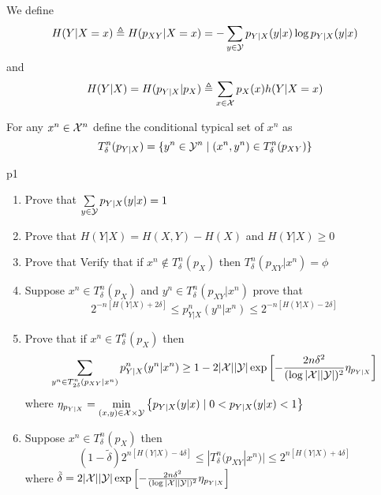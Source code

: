 \documentclass[a4paper, 11pt]{article}
\begin{document}
 We define $$H(Y|X=x)\triangleq H(p_{XY}|X=x)=-\sum_{y\in \mathcal{Y}}p_{Y|X}(y|x)\log p_{Y|X}(y|x)$$ and $$H(Y|X)=H(p_{Y|X}|p_X)\triangleq \sum_{x\in \mathcal{X}}p_X(x)h(Y|X=x)$$
 
 For any $x^n\in \mathcal{X}^n$ define the conditional typical set of $x^n$ as $$T_{\delta}^n(p_{Y|X})=\left\{ y^n\in \mathcal{Y}^n\mid (x^n,y^n)\in T_{\delta}^n(p_{XY}) \right\}$$
\begin{problem}{%
	}{p1%
	}
	\begin{enumerate}
		\item Prove that $\sum\limits_{y\in \mathcal{Y}}p_{Y|X}(y|x)=1$
		\item Prove that  $H(Y|X)=H(X,Y)-H(X)$ and $H(Y|X)\geq 0$
		\item Prove that Verify that if $x^n\notin T_{\delta}^n(p_X)$ then $T_{\delta}^n(p_{XY}|x^n)=\phi$
		\item Suppose $x^n\in T_{\delta}^n(p_X)$ and $y^n\in T_{\delta}^n(p_{XY}|x^n)$ prove that $$2^{-n[H(Y|X)+2\delta]}\leq p^n_{Y|X}(y^n|x^n)\leq 2^{-n[H(Y|X)-2\delta]}$$
		\item Prove that if $x^n\in T_{\delta}^n(p_{X})$ then $$\sum_{y^n\in T_{2\delta}^n(p_{XY}|x^n)}p_{Y|X}^n(y^n|x^n)\geq 1-2|\mathcal{X}||\mathcal{Y}|\exp\left[ -\frac{2n\delta^2}{(\log |\mathcal{X}||\mathcal{Y}|)^2} \eta_{p_{Y|X}}\right]$$ where $\eta_{p_{Y|X}}=\min\limits_{(x,y)\in \mathcal{X}\times \mathcal{Y}}\left\{ p_{Y|X}(y|x)\mid 0<p_{Y|X}(y|x)<1 \right\}$
		\item Suppose $x^n\in T_{\delta}^n(p_X)$ then $$(1-\tilde{\delta})2^{n[H(Y|X)-4\delta]}\leq |T_{\delta}^n(p_{XY}|x^n)|\leq 2^{n[H(Y|X)+4\delta]}$$ where $\tilde{\delta}=2|\mathcal{X}||\mathcal{Y}|\exp\left[ -\frac{2n\delta^2}{(\log |\mathcal{X}||\mathcal{Y}|)^2} \eta_{p_{Y|X}}\right]$
	\end{enumerate}
\end{problem}


\solve{
}
\pagebreak

	

	
\end{document}
